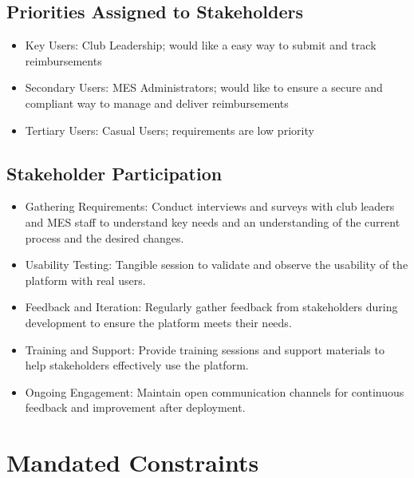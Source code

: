 \documentclass[12pt]{article}
\begin{document}
  \subsection{Priorities Assigned to Stakeholders}
    \begin{itemize}
      \item Key Users: Club Leadership; would like a easy way to submit and track reimbursements
      \item Secondary Users: MES Administrators; would like to ensure a secure and compliant way to manage and deliver reimbursements
      \item Tertiary Users: Casual Users; requirements are low priority
    \end{itemize}
  \subsection{Stakeholder Participation}
    \begin{itemize}
      \item Gathering Requirements: Conduct interviews and surveys with club leaders and MES staff to understand key needs and an understanding of the current process and the desired changes.
      \item Usability Testing: Tangible session to validate and observe the usability of the platform with real users. 
      \item Feedback and Iteration: Regularly gather feedback from stakeholders during development to ensure the platform meets their needs.
      \item Training and Support: Provide training sessions and support materials to help stakeholders effectively use the platform.
      \item Ongoing Engagement: Maintain open communication channels for continuous feedback and improvement after deployment.
    \end{itemize}


\section{Mandated Constraints}
\end{document}
